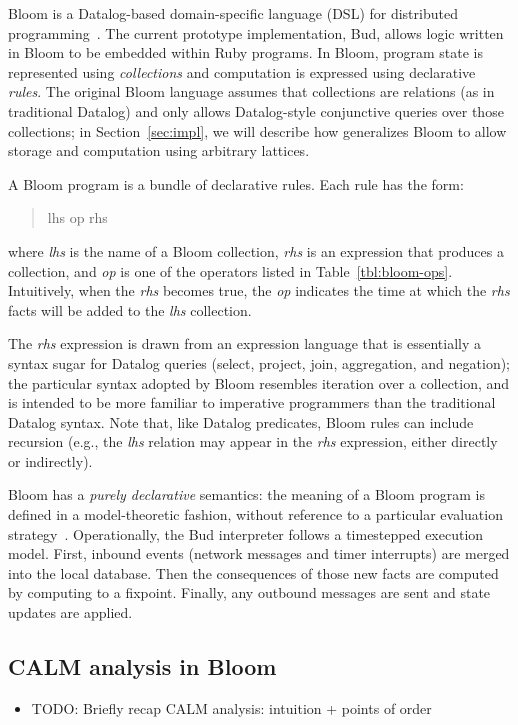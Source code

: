 Bloom is a Datalog-based domain-specific language (DSL) for distributed
programming~\cite{Alvaro2011,bloom}. The current prototype implementation, Bud,
allows logic written in Bloom to be embedded within Ruby programs. In Bloom,
program state is represented using \emph{collections} and computation is
expressed using declarative \emph{rules}. The original Bloom language assumes
that collections are relations (as in traditional Datalog) and only allows
Datalog-style conjunctive queries over those collections; in
Section~\ref{sec:impl}, we will describe how \lang generalizes Bloom to allow
storage and computation using arbitrary lattices.

A Bloom program is a bundle of declarative rules. Each rule has the form:
\begin{quotation}
lhs op rhs
\end{quotation}
where \emph{lhs} is the name of a Bloom collection, \emph{rhs} is an expression
that produces a collection, and \emph{op} is one of the operators listed in
Table~\ref{tbl:bloom-ops}. Intuitively, when the \emph{rhs} becomes true, the
\emph{op} indicates the time at which the \emph{rhs} facts will be added to the
\emph{lhs} collection.



The \emph{rhs} expression is drawn from an expression language that is
essentially a syntax sugar for Datalog queries (select, project, join,
aggregation, and negation); the particular syntax adopted by Bloom resembles
iteration over a collection, and is intended to be more familiar to imperative
programmers than the traditional Datalog syntax. Note that, like Datalog
predicates, Bloom rules can include recursion (e.g., the \emph{lhs} relation may
appear in the \emph{rhs} expression, either directly or indirectly).

Bloom has a \emph{purely declarative} semantics: the meaning of a Bloom program
is defined in a model-theoretic fashion, without reference to a particular
evaluation strategy~\cite{dedalus}. Operationally, the Bud interpreter follows a
timestepped execution model. First, inbound events (network messages and timer
interrupts) are merged into the local database. Then the consequences of those
new facts are computed by computing to a fixpoint. Finally, any outbound
messages are sent and state updates are applied.

\subsection{CALM analysis in Bloom}
\begin{itemize}
\item TODO: Briefly recap CALM analysis: intuition + points of order
\end{itemize}
